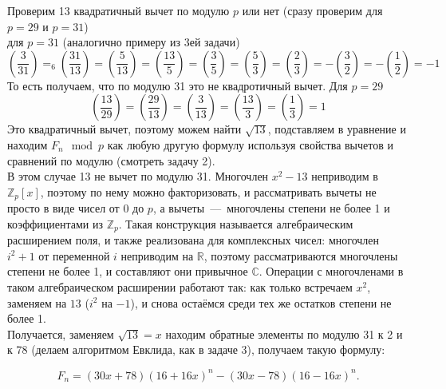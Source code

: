 \documentclass[a4paper,12pt]{article} %
\begin{document}
Проверим 13 квадратичный вычет по модулю $p$ или нет (сразу проверим для $ p = 29 $ и $ p = 31 $)\\
для $ p = 31 $ (аналогично примеру из 3ей задачи)
$$
\left(\frac{3}{31}\right)=_{6}\left(\frac{31}{13}\right)=\left(\frac{5}{13}\right)=\left(\frac{13}{5}\right)=\left(\frac{3}{5}\right)=\left(\frac{5}{3}\right)=\left(\frac{2}{3}\right)=-\left(\frac{3}{2}\right) = -\left(\frac{1}{2} \right) = -1
$$
То есть получаем, что по модулю 31 это не квадротичный вычет. Для $ p = 29 $
$$
\left(\frac{13}{29}\right)=\left(\frac{29}{13}\right)=\left(\frac{3}{13}\right)=\left(\frac{13}{3}\right)=\left(\frac{1}{3}\right)=1
$$
Это квадратичный вычет, поэтому можем найти $\sqrt{13}$, подставляем в уравнение и находим $F_n \mod p$ как любую другую формулу используя свойства вычетов и сравнений по модулю (смотреть задачу 2). \\

В этом случае 13 не вычет по модулю 31. Многочлен $x^2 - 13$ неприводим в $\mathbb{Z}_p[x]$, поэтому по нему можно факторизовать, и рассматривать вычеты не просто в виде чисел от $0$ до $p$, а вычеты~---~многочлены степени не более 1 и коэффициентами из $\mathbb{Z}_p$. Такая конструкция называется алгебраическим расширением поля, и также реализована для комплексных чисел: многочлен $i^2+1$ от переменной $i$ неприводим на $\mathbb{R}$, поэтому рассматриваются многочлены степени не более 1, и составляют они привычное $\mathbb{C}$. Операции с многочленами в таком алгебраическом расширении работают так: как только встречаем $x^2$, заменяем на $13$ ($i^2$ на $-1$), и снова остаёмся среди тех же остатков степени не более 1.\\

Получается, заменяем $ \sqrt{13} = x $ находим обратные элементы по модулю 31 к 2 и к 78 (делаем алгоритмом Евклида, как в задаче 3), получаем такую формулу:

$$
F_{n}=(30 x+78)\left(16+16 x\right)^{n}-(30 x-78)\left(16 -16 x\right)^{n}.
$$
\end{document}
